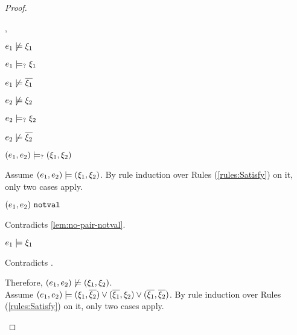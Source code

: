 \begin{proof}
\begin{byCases}
\begin{byCases}
\begin{byCases}
        \item[\cmaysatisfy{e_1}{\xi_1},\cmaysatisfy{e_2}{\xi_2}]
            \begin{pfsteps*}
            \item $e_1 \not\models \xi_1$  
            \item $e_1 \models_{?} \xi_1$  
            \item $e_1 \not\models \overline{\xi_1}$  
            \item $e_2 \not\models \xi_2$  
            \item $e_2 \models_{?} \xi_2$  
            \item $e_2 \not\models \overline{\xi_2}$  
            \item $(e_1 , e_2) \models_{?} (\xi_1 , \xi_2)$ 
            \end{pfsteps*}
            Assume $(e_1 , e_2) \models (\xi_1 , \xi_2)$. By rule induction over Rules (\ref{rules:Satisfy}) on it, only two cases apply. 
           \begin{byCases}
            \item[\text{(\ref{rule:CSNotValPair})}]
                \begin{pfsteps*}
                \item $(e_1 , e_2) ~\mathtt{notval}$ 
                \end{pfsteps*}
                Contradicts \autoref{lem:no-pair-notval}.
            \item[\text{(\ref{rule:CSPair})}]
                \begin{pfsteps*}
                \item $e_1 \models \xi_1$ 
                \end{pfsteps*}
                Contradicts .
            \end{byCases}
            Therefore, $(e_1 , e_2) \not\models (\xi_1 , \xi_2)$. \\
            Assume $(e_1 , e_2) \models (\xi_1 , \overline{\xi_2}) \vee (\overline{\xi_1} , \xi_2) \vee (\overline{\xi_1} , \overline{\xi_2})$. By rule induction over Rules (\ref{rules:Satisfy}) on it, only two cases apply.

\end{byCases}
\end{byCases}
\end{byCases}
\end{proof}
